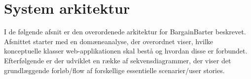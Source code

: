 \chapter{System arkitektur}\label{ch:Systemarkitektur}
I de følgende afsnit er den overordenede arkitektur for BargainBarter beskrevet. Afsnittet starter med en domæneanalyse, der overordnet viser, hvilke konceptuelle klasser web-applikationen skal bestå og hvordan disse er forbundet. Efterfølgende er der udviklet en række af sekvensdiagrammer, der viser det grundlæggende forløb/flow af forskellige essentielle scenarier/user stories.


